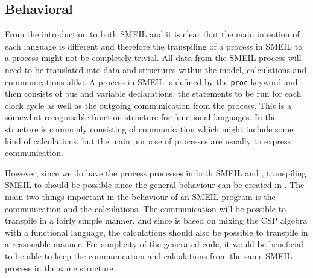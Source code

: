 \subsection{Behavioral}

From the introduction to both SMEIL and \cspm it is clear that the main intention of each language is different and therefore the transpiling of a process in SMEIL to a \cspm process might not be completely trivial. All data from the SMEIL process will need to be translated into data and structures within the \cspm model, calculations and communications alike.
A process in SMEIL is defined by the \texttt{proc} keyword and then consists of bus and variable declarations, the statements to be run for each clock cycle as well as the outgoing communication from the process. This is a somewhat recognisable function structure for functional languages. In \cspm the structure is commonly consisting of communication which might include some kind of calculations, but the main purpose of \cspm processes are usually to express communication. 
%
%

However, since we do have the process processes in both SMEIL and \cspm, transpiling SMEIL to \cspm should be possible since the general behaviour can be created in \cspm. The main two things important in the behaviour of an SMEIL program is the communication and the calculations. The communication will be possible to transpile in a fairly simple manner, and since \cspm is based on mixing the CSP algebra with a functional language, the calculations should also be possible to transpile in a reasonable manner.
For simplicity of the generated code, it would be beneficial to be able to keep the communication and calculations from the same SMEIL process in the same \cspm structure.

